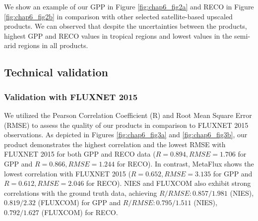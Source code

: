 We show an example of our GPP in Figure \ref{fig:chap6_fig2a} and RECO in Figure \ref{fig:chap6_fig2b} in comparison with other selected satellite-based upscaled products. We can observed that despite the uncertainties between the products, highest GPP and RECO values in tropical regions and lowest values in the semi-arid regions in all products. \par

\subsection{Technical validation}
\subsubsection{Validation with FLUXNET 2015}
We utilized the Pearson Correlation Coefficient (R) and Root Mean Square Error (RMSE) to assess the quality of our products in comparison to FLUXNET 2015 observations. As depicted in Figures \ref{fig:chap6_fig3a} and \ref{fig:chap6_fig3b}, our product demonstrates the highest correlation and the lowest RMSE with FLUXNET 2015 for both GPP and RECO data ($R = 0.894, RMSE = 1.706$ for GPP and $R = 0.866, RMSE = 1.244$ for RECO). In contrast, MetaFlux shows the lowest correlation with FLUXNET 2015 ($R = 0.652, RMSE = 3.135$ for GPP and $R = 0.612, RMSE = 2.046$ for RECO). NIES and FLUXCOM also exhibit strong correlations with the ground truth data, achieving $R/RMSE: 0.857/1.981$ (NIES), $0.819/2.32$ (FLUXCOM) for GPP and $R/RMSE: 0.795/1.511$ (NIES), $0.792/1.627$ (FLUXCOM) for RECO. \par

